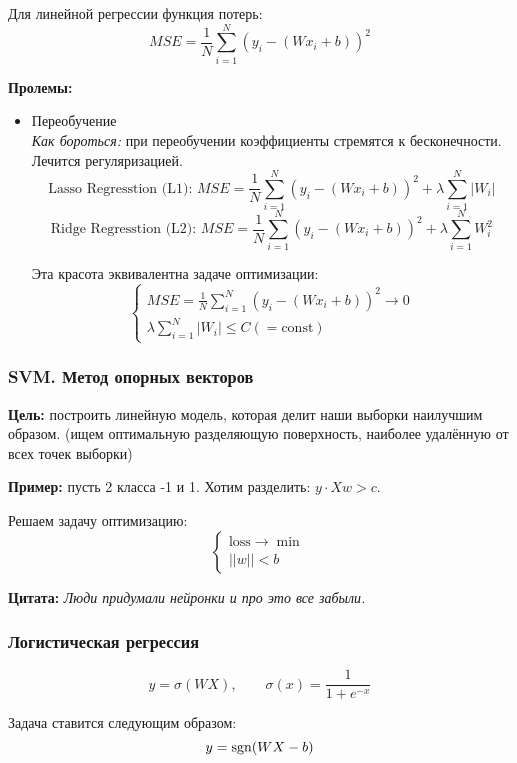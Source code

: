 \documentclass[a4paper,14pt]{article}
\begin{document}
    Для линейной регрессии функция потерь:
    \[
        MSE = \frac{1}{N} \sum\limits_{i=1}^N \left( y_i - (W x_i + b)\right) ^ 2
    \]

    {\bf Пролемы:}
    \begin{itemize}
        \item Переобучение\\
        {\it Как бороться:} при переобучении коэффициенты стремятся к бесконечности. Лечится регуляризацией.
        \[
           \text{Lasso Regresstion (L1): } MSE = \frac{1}{N} \sum\limits_{i=1}^N \left( y_i - (W x_i + b)\right) ^ 2 + \lambda  \sum\limits_{i=1}^N \left|W_{i}\right|
        \]
        \[
            \text{Ridge Regresstion (L2): } MSE = \frac{1}{N} \sum\limits_{i=1}^N \left( y_i - (W x_i + b)\right) ^ 2 + \lambda  \sum\limits_{i=1}^N W_{i}^2
        \]

        Эта красота эквивалентна задаче оптимизации:
        \[
            \begin{cases}
                MSE = \frac{1}{N} \sum\limits_{i=1}^N \left( y_i - (W x_i + b)\right) ^ 2 \rightarrow 0 \\
                \lambda  \sum\limits_{i=1}^N \left|W_{i}\right| \le C (=\mathrm{const})
            \end{cases}
        \]
    \end{itemize}

    \subsubsection{SVM. Метод опорных векторов}
    {\bf Цель:} построить линейную модель, которая делит наши выборки наилучшим образом. (ищем оптимальную разделяющую поверхность, наиболее удалённую от всех точек выборки)

    {\bf Пример:} пусть 2 класса -1 и 1. Хотим разделить: $y \cdot Xw > c$.

    Решаем задачу оптимизацию:
    \[
        \begin{cases}
            \mathrm{loss} \rightarrow \min \\
            ||w|| < b
        \end{cases}
    \]

    {\bf Цитата: } {\it Люди придумали нейронки и про это все забыли.}

    \subsubsection{Логистическая регрессия}
    \[
        y = \sigma(WX), \qquad \sigma(x) = \frac{1}{1 + e^{-x}}
    \]

    Задача ставится следующим образом:
    \[
        y = \operatorname{sgn}(WX - b)
    \]
\end{document}
